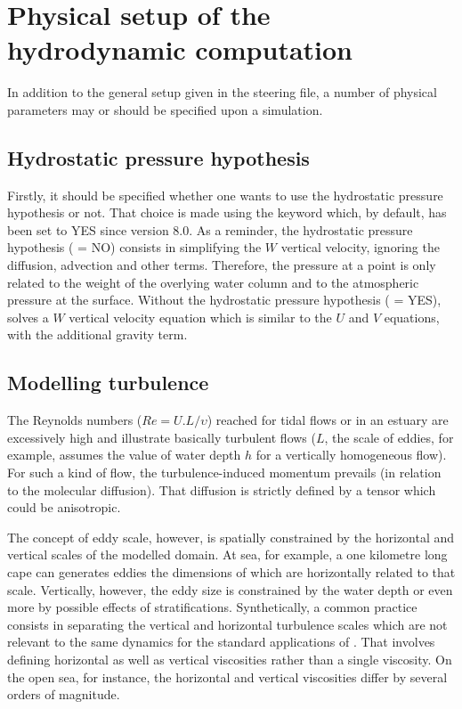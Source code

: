 \chapter{Physical setup of the hydrodynamic computation}

In addition to the general setup given in the steering file, a number of
physical parameters may or should be specified upon a simulation.


\section{Hydrostatic pressure hypothesis}

Firstly, it should be specified whether one wants to use the hydrostatic
pressure hypothesis or not. That choice is made using the keyword
 which, by default, has been set to YES since
version 8.0.
As a reminder, the hydrostatic pressure hypothesis
( = NO)
consists in simplifying the
$W$ vertical velocity, ignoring the diffusion, advection and other
terms. Therefore, the pressure at a point is only related to the weight of the
overlying water column and to the atmospheric pressure at the surface. Without
the hydrostatic pressure hypothesis ( = YES),
 solves a $W$ vertical velocity equation which is similar to
the $U$ and $V$ equations, with the additional gravity term.


\section{Modelling turbulence}

The Reynolds numbers ($Re = U.L/\upsilon$) reached for tidal
flows or in an estuary are excessively high and illustrate basically turbulent
flows ($L$, the scale of eddies, for example, assumes the value of water
depth $h$ for a vertically homogeneous flow). For such a kind of flow,
the turbulence-induced momentum prevails (in relation to the molecular
diffusion). That diffusion is strictly defined by a tensor which could be
anisotropic.

The concept of eddy scale, however, is spatially constrained by the horizontal
and vertical scales of the modelled domain. At sea, for example, a one
kilometre long cape can generates eddies the dimensions of which are
horizontally related to that scale. Vertically, however, the eddy size is
constrained by the water depth or even more by possible effects of
stratifications. Synthetically, a common practice consists in separating the
vertical and horizontal turbulence scales which are not relevant to the same
dynamics for the standard applications of . That involves defining
horizontal as well as vertical viscosities rather than a single viscosity. On
the open sea, for instance, the horizontal and vertical viscosities differ by
several orders of magnitude.

